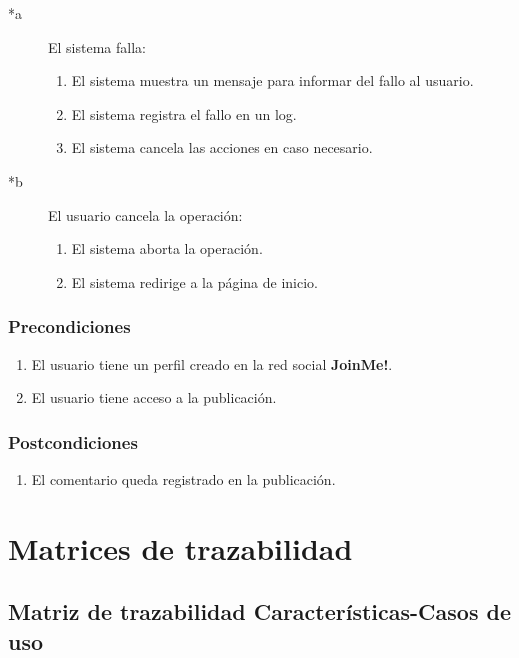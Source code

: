 \documentclass[12pt, a4paper, titlepage]{article}
\begin{document}
\begin{description}
	\item [*a] El sistema falla:
	\begin{enumerate}
		\item El sistema muestra un mensaje para informar del fallo al usuario.
		\item El sistema registra el fallo en un log.
		\item El sistema cancela las acciones en caso necesario.
	\end{enumerate}
\end{description}

\begin{description}
	\item [*b] El usuario cancela la operación:
	\begin{enumerate}
		\item El sistema aborta la operación.
		\item El sistema redirige a la página de inicio.
	\end{enumerate}
\end{description}

\subsubsection{Precondiciones}
\begin{enumerate}
	\item El usuario tiene un perfil creado en la red social \textbf{JoinMe!}.
	\item El usuario tiene acceso a la publicación.
\end{enumerate}
\subsubsection{Postcondiciones}
\begin{enumerate}
	\item El comentario queda registrado en la publicación.
\end{enumerate}

\section{Matrices de trazabilidad}  
\subsection{\large Matriz de trazabilidad Características-Casos de uso}
\end{document}
